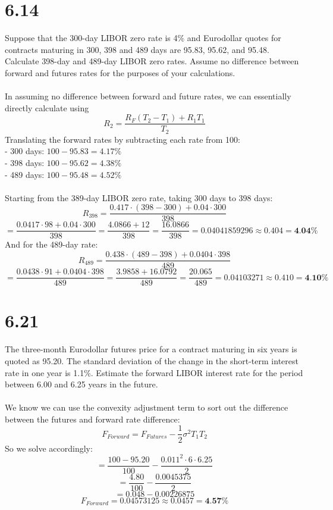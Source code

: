 \documentclass{article}
\begin{document}
{\Large 

\section*{6.14}
Suppose that the 300-day LIBOR zero rate is 4\% and Eurodollar quotes for contracts maturing in 300, 398 and 489 days are 95.83, 95.62, and 95.48. Calculate 398-day and 489-day LIBOR zero rates. Assume no difference between forward and futures rates for the purposes of your calculations. \\ \\ 
In assuming no difference between forward and future rates, we can essentially directly calculate using 
\[
  R_2 = \frac{R_F(T_2-T_1)+R_1T_1}{T_2}
\]
Translating the forward rates by subtracting each rate from 100: \\
- 300 days: \(100 - 95.83 = 4.17\%\) \\
- 398 days: \(100 - 95.62 = 4.38\% \) \\
- 489 days: \(100 - 95.48 = 4.52\% \) \\ \\
Starting from the 389-day LIBOR zero rate, taking 300 days to 398 days:
\[
  R_{398} = \frac{0.417 \cdot (398 - 300) + 0.04 \cdot 300}{398}
\]
\[
  =  \frac{0.0417 \cdot 98 + 0.04 \cdot 300}{398} = \frac{4.0866 + 12}{398} = \frac{16.0866}{398} = 0.04041859296 \approx 0.404 = \boxed{\textbf{4.04\%}}
\]
And for the 489-day rate:
\[
  R_{489} = \frac{0.438 \cdot (489 - 398) + 0.0404 \cdot 398}{489}
\]
\[
  = \frac{0.0438 \cdot 91 + 0.0404 \cdot 398}{489} = \frac{3.9858 + 16.0792}{489} = \frac{20.065}{489} = 0.04103271 \approx 0.410 = \boxed{\textbf{4.10\%}}
\]

}
{\Large 

\section*{6.21}
The three-month Eurodollar futures price for a contract maturing in six years is quoted as 95.20. The standard deviation of the change in the short-term interest rate in one year is 1.1\%. Estimate the forward LIBOR interest rate for the period between 6.00 and 6.25 years in the future. \\ \\
We know we can use the convexity adjustment term to sort out the difference between the futures and forward rate difference:
\[
  F_{Forward} = F_{Futures} - \frac{1}{2} \sigma^2 T_1 T_2
\]
So we solve accordingly:
\[
  = \frac{100 - 95.20}{100} - \frac{0.011^2 \cdot 6 \cdot 6.25}{2}
\]
\[
  = \frac{4.80}{100} - \frac{0.0045375}{2}
\]
\[
  = 0.048 - 0.00226875
\]
\[
  F_{Forward} = 0.04573125 \approx 0.0457 = \boxed{\textbf{4.57\%}}
\]

}
\end{document}
